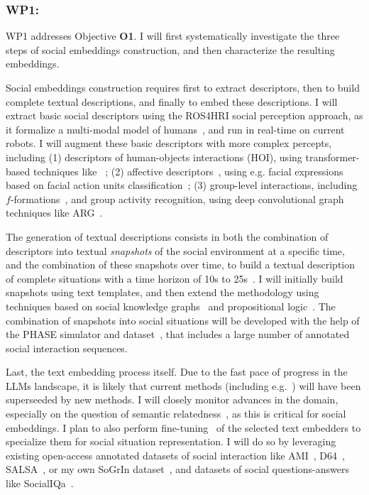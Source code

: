 \subsubsection{WP1: \textbf{\wpOne}}

WP1 addresses Objective \textbf{O1}. I will first systematically investigate the
three steps of social embeddings construction, and then characterize the
resulting embeddings.

Social embeddings construction requires first to extract descriptors, then to
build complete textual descriptions, and finally to embed these descriptions.  I
will extract basic social descriptors using the ROS4HRI social perception
approach, as it formalize a multi-modal model of humans~\cite{lemaignan2022ros},
and run in real-time on current robots. I will augment these basic descriptors
with more complex percepts, including (1) descriptors of human-objects
interactions (HOI), using transformer-based techniques
like~\cite{iftekhar2022what} ; (2) affective
descriptors~\cite{vinciarelli2009social}, using e.g. facial expressions based on
facial action units classification~\cite{martinez2019automatic}; (3) group-level
interactions, including $f$-formations~\cite{setti2015fformation}, and group
activity recognition, using deep convolutional graph techniques like
ARG~\cite{wu2019learning}.


The generation of textual descriptions consists in both the combination of
descriptors into textual \emph{snapshots} of the social environment at a
specific time, and the combination of these snapshots over time, to build a
textual description of complete situations with a time horizon of 10s to
25s~\cite{netanyahu2021phase}. I will initially build snapshots using text
templates, and then extend the methodology using techniques based on
social knowledge graphs~\cite{sap2019atomic} and propositional
logic~\cite{tsoi2022sean}. The combination of snapshots into social situations
will be developed with the help of the PHASE simulator and
dataset~\cite{netanyahu2021phase}, that includes a large number of annotated
social interaction sequences.

Last, the text embedding process itself. Due to the fast pace of progress in the
LLMs landscape, it is likely that current
methods (including e.g.~\cite{reimers2019sentencebert,muennighoff2022sgpt}) will
have been superseeded by new methods. I will closely monitor
advances in the domain, especially on the question of semantic
relatedness~\cite{thakur2021beir}, as this is critical for social
embeddings. I plan to also perform fine-tuning~\cite{hadsell2006dimensionality}
of the selected text embedders to specialize them for social situation
representation. I will do so by leveraging existing open-access annotated
datasets of social interaction like AMI~\cite{carletta2007ami},
D64~\cite{oertel2013d64}, SALSA~\cite{alameda2015salsa}, or my own SoGrIn
dataset~\cite{webb2023sogrin}, and datasets of social questions-answers like
SocialIQa~\cite{sap2019social}.

